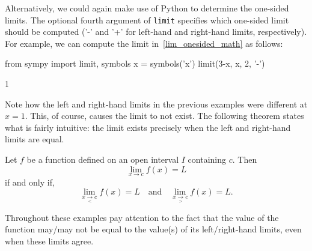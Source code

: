 \begin{example}
\ifpython
\ifcourse
Alternatively, we could again make use of Python to determine the one-sided limits. The optional fourth argument of  \lstinline{limit} specifies which one-sided limit should be computed ('-' and '+' for left-hand and right-hand limits, respectively). For example, we can compute the limit in~\ref{lim_onesided_math} as follows:
\begin{pyin}
from sympy import limit, symbols
x = symbols('x')
limit(3-x, x, 2, '-')
\end{pyin}
\begin{pyout}
1
\end{pyout}
\fi
\fi
\end{example}

Note how the left and right-hand limits in the previous examples were different at $x=1$. This, of course, causes the limit to not exist. The following theorem states what is fairly intuitive: the limit exists precisely when the left and right-hand limits are equal.

\begin{theorem}\label{thm:leftrightlimits}
{Let $f$ be a function defined on an open interval $I$ containing $c$.  Then $$\lim_{x\to c}f(x) = L$$ if and only if, $$\lim_{x\underset{<}{\rightarrow}c}f(x) = L \quad \text{and} \quad \lim_{x\underset{>}{\rightarrow}c}f(x) = L.$$}
\end{theorem}


Throughout these examples pay attention to the fact that the value of the function may/may not be equal to the value(s) of its left/right-hand limits, even when these limits agree.

